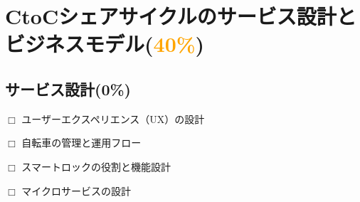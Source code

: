 \section{CtoCシェアサイクルのサービス設計とビジネスモデル(\textcolor{orange}{40\%})}
  \label{sec:CtoCシェアサイクルのサービス設計とビジネスモデル}
      
  \subsection{サービス設計(0\%)}
    \label{sec:サービス設計}
      \par $\Box$ ユーザーエクスペリエンス（UX）の設計
      \par $\Box$ 自転車の管理と運用フロー
      \par $\Box$ スマートロックの役割と機能設計
      \par $\Box$ マイクロサービスの設計
  
